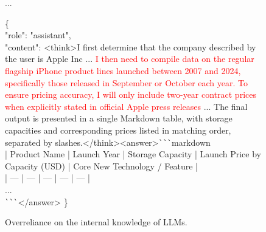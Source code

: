\documentclass[11pt, letterpaper, logo, onecolumn, copyright, numbering]{paper_improved}
\begin{document}
\begin{figure}[htbp]
    \begin{tcolorbox}[title=Multi-turn Converation of WebSailor (GPT-5), colback=green!12]
    ...
        \begin{tcolorbox}[colback=green!6,colframe=green!30,boxrule=0.3pt,arc=0.6mm,sharp corners, left=1.5mm,right=1.5mm,top=1mm,bottom=1mm,breakable]
              \ttfamily\footnotesize
                \{\\
                    \hspace*{15pt}"role": "assistant",\\
                    \hspace*{15pt}"content": <think>I first determine that the company described by the user is Apple Inc ... \textcolor{red}{I then need to compile data on the regular flagship iPhone product lines launched between 2007 and 2024, specifically those released in September or October each year. To ensure pricing accuracy, I will only include two-year contract prices when explicitly stated in official Apple press releases} ... The final output is presented in a single Markdown table, with storage capacities and corresponding prices listed in matching order, separated by slashes.</think><answer>\verb|```|markdown\\
| Product Name | Launch Year | Storage Capacity | Launch Price by Capacity (USD) | Core New Technology / Feature |\\
| --- | --- | --- | --- | --- |\\
...\\
\verb|```|</answer>
              \}
        \end{tcolorbox}
    \end{tcolorbox}

\caption{Overreliance on the internal knowledge of LLMs.}
\label{fig:case_internel_knowledge}
\end{figure}

\end{document}

